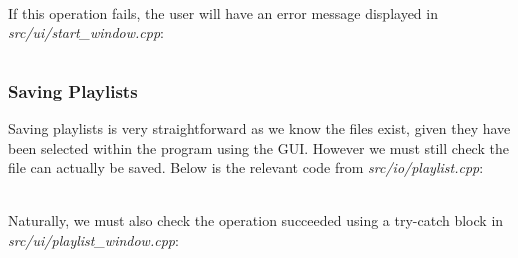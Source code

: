 \paragraph{}
If this operation fails, the user will have an error message displayed in \textit{src/ui/start\_window.cpp}:
\inputminted[linenos, firstline=44, lastline=80]{c++}{../src/ui/start_window.cpp}

\pagebreak
\subsubsection{Saving Playlists}
Saving playlists is very straightforward as we know the files exist, given they have been selected within the program using the GUI. However we must still check the file can actually be saved. Below is the relevant code from \textit{src/io/playlist.cpp}:
\inputminted[linenos, firstline=25, lastline=55]{c++}{../src/io/playlist.cpp}

\paragraph{}
Naturally, we must also check the operation succeeded using a try-catch block in \textit{src/ui/playlist\_window.cpp}:
\inputminted[linenos, firstline=84, lastline=118]{c++}{../src/ui/playlist_window.cpp}